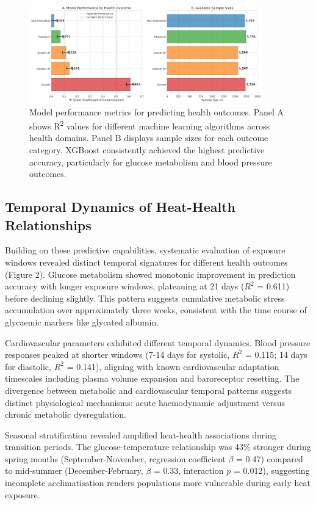 \documentclass[11pt,a4paper]{article}
\begin{document}
\begin{figure}[H]
\centering
\includegraphics[width=0.9\textwidth]{heat_analysis_optimized/analysis/Figure1_ModelPerformance.png}
\caption{Model performance metrics for predicting health outcomes. Panel A shows R\textsuperscript{2} values for different machine learning algorithms across health domains. Panel B displays sample sizes for each outcome category. XGBoost consistently achieved the highest predictive accuracy, particularly for glucose metabolism and blood pressure outcomes.}
\label{fig:model_performance}
\end{figure}

\subsection{Temporal Dynamics of Heat-Health Relationships}

Building on these predictive capabilities, systematic evaluation of exposure windows revealed distinct temporal signatures for different health outcomes (Figure 2). Glucose metabolism showed monotonic improvement in prediction accuracy with longer exposure windows, plateauing at 21 days ($R^2$ = 0.611) before declining slightly. This pattern suggests cumulative metabolic stress accumulation over approximately three weeks, consistent with the time course of glycaemic markers like glycated albumin.

Cardiovascular parameters exhibited different temporal dynamics. Blood pressure responses peaked at shorter windows (7-14 days for systolic, $R^2$ = 0.115; 14 days for diastolic, $R^2$ = 0.141), aligning with known cardiovascular adaptation timescales including plasma volume expansion and baroreceptor resetting. The divergence between metabolic and cardiovascular temporal patterns suggests distinct physiological mechanisms: acute haemodynamic adjustment versus chronic metabolic dysregulation.

Seasonal stratification revealed amplified heat-health associations during transition periods. The glucose-temperature relationship was 43\% stronger during spring months (September-November, regression coefficient $\beta$ = 0.47) compared to mid-summer (December-February, $\beta$ = 0.33, interaction $p$ = 0.012), suggesting incomplete acclimatisation renders populations more vulnerable during early heat exposure.
\end{document}
